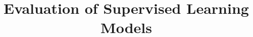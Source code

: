 \title{Evaluation of Supervised Learning Models}
\label{chp:evaluation-supervised-learning}
\author{}
\institute{}
\maketitle